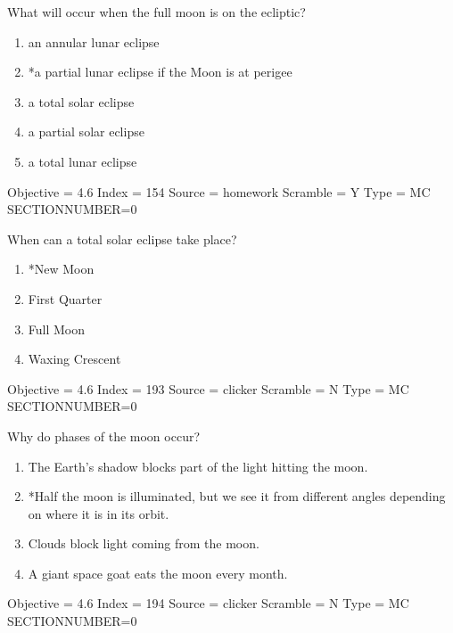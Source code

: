 \documentclass[11pt]{article}
\begin{document}
\begin{enumerate}
\begin{minipage}{\textwidth}
\begin{minipage}{\textwidth}
\item What will occur when the full moon is on the ecliptic?
\begin{enumerate} 
\setlength{\itemsep}{1pt} 
\setlength{\parskip}{0pt} 
\setlength{\parsep}{0pt}
\setlength{\multicolsep}{1pt} 
\item an annular lunar eclipse
\item *a partial lunar eclipse if the Moon is at perigee
\item a total solar eclipse
\item a partial solar eclipse
\item a total lunar eclipse
\end{enumerate} 
Objective = 4.6
Index = 154
Source = homework
Scramble = Y
Type = MC
SECTIONNUMBER=0
\end{minipage}
\end{minipage}
\vskip 0.20in

\begin{minipage}{\textwidth}
\begin{minipage}{\textwidth}
\item When can a total solar eclipse take place?
\begin{multicols}{3}
\begin{enumerate} 
\setlength{\itemsep}{1pt} 
\setlength{\parskip}{0pt} 
\setlength{\parsep}{0pt}
\setlength{\multicolsep}{1pt} 
\item *New Moon
\item First Quarter
\item Full Moon
\item Waxing Crescent
\end{enumerate} 
\vfill 
\end{multicols}

Objective = 4.6
Index = 193
Source = clicker
Scramble = N
Type = MC
SECTIONNUMBER=0
\end{minipage}
\end{minipage}
\vskip 0.20in

\begin{minipage}{\textwidth}
\begin{minipage}{\textwidth}
\item Why do phases of the moon occur?
\begin{enumerate} 
\setlength{\itemsep}{1pt} 
\setlength{\parskip}{0pt} 
\setlength{\parsep}{0pt}
\setlength{\multicolsep}{1pt} 
\item The Earth’s shadow blocks part of the light hitting the moon.
\item *Half the moon is illuminated, but we see it from different angles depending on where it is in its orbit.
\item Clouds block light coming from the moon.
\item A giant space goat eats the moon every month.
\end{enumerate} 
Objective = 4.6
Index = 194
Source = clicker
Scramble = N
Type = MC
SECTIONNUMBER=0
\end{minipage}
\end{minipage}
\vskip 0.20in


\end{enumerate}
\end{document}
